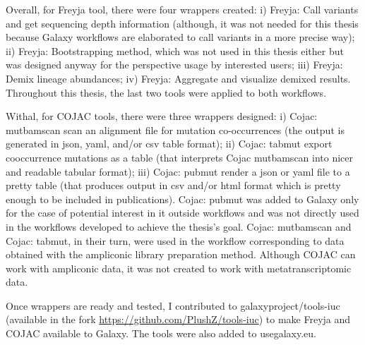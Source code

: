             Overall, for Freyja tool, there were four wrappers created: i) Freyja: Call variants and get sequencing depth information (although, it was not needed for this thesis because Galaxy workflows are elaborated to call variants in a more precise way); ii) Freyja: Bootstrapping method, which was not used in this thesis either but was designed anyway for the perspective usage by interested users; iii) Freyja: Demix lineage abundances; iv) Freyja: Aggregate and visualize demixed results. Throughout this thesis, the last two tools were applied to both workflows.
            
            Withal, for COJAC tools, there were three wrappers designed: i) Cojac: mutbamscan scan an alignment file for mutation co-occurrences (the output is generated in \acrshort{json}, \acrshort{yaml}, and/or \acrshort{csv} table format); ii) Cojac: tabmut export cooccurrence mutations as a table (that interprets Cojac mutbamscan into nicer and readable tabular format); iii) Cojac: pubmut render a \acrshort{json} or \acrshort{yaml} file to a pretty table (that produces output in \acrshort{csv} and/or \acrshort{html} format which is pretty enough to be included in publications). Cojac: pubmut was added to Galaxy only for the case of potential interest in it outside workflows and was not directly used in the workflows developed to achieve the thesis's goal. Cojac: mutbamscan and Cojac: tabmut, in their turn, were used in the workflow corresponding to data obtained with the ampliconic library preparation method. Although COJAC can work with ampliconic data, it was not created to work with metatranscriptomic data. 
            
            Once wrappers are ready and tested, I contributed to galaxyproject/tools-iuc (available in the fork \url{https://github.com/PlushZ/tools-iuc}) to make Freyja and COJAC available to Galaxy. The tools were also added to usegalaxy.eu. 
            
